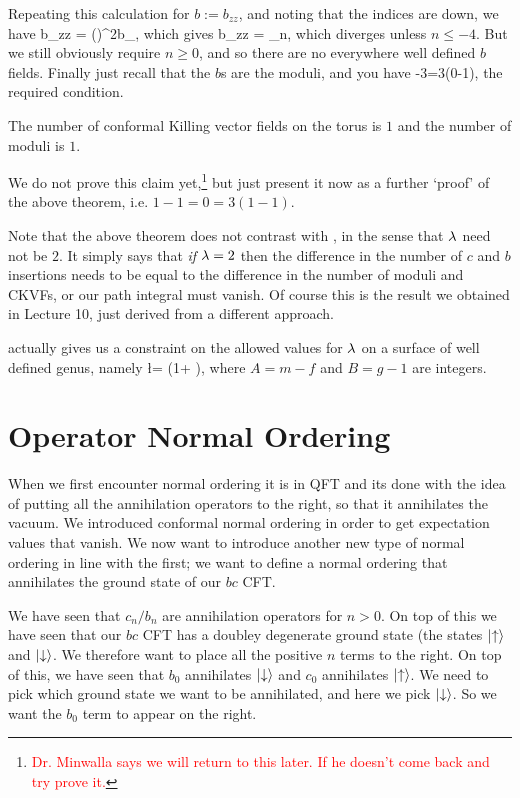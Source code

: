     Repeating this calculation for $b:=b_{zz}$, and noting that the indices are down, we have
    \bse 
        b_{zz} = \bigg(\bigg)^2b_{\omega\omega},
    \ese 
    which gives 
    \bse 
        b_{zz} =  \sum_n,
    \ese 
    which diverges unless $n\leq -4$. But we still obviously require $n\geq0$, and so there are no everywhere well defined $b$ fields. Finally just recall that the $b$s are the moduli, and you have 
    -3=3(0-1),
    \ese 
    the required condition. 
\eex 

\bcl 
    The number of conformal Killing vector fields on the torus is $1$ and the number of moduli is $1$.
\ecl 

We do not prove this claim yet,\footnote{\textcolor{red}{Dr. Minwalla says we will return to this later. If he doesn't come back and try prove it.}} but just present it now as a further `proof' of the above theorem, i.e. $1-1=0=3(1-1)$.

\br 
    Note that the above theorem does not contrast with , in the sense that $\lambda$ need not be $2$. It simply says that \textit{if} $\lambda=2$ then the difference in the number of $c$ and $b$ insertions needs to be equal to the difference in the number of moduli and CKVFs, or our path integral must vanish. Of course this is the result we obtained in Lecture 10, just derived from a different approach.  
\er 

\br 
     actually gives us a constraint on the allowed values for $\lambda$ on a surface of well defined genus, namely 
    \bse 
        \l = \bigg(1+ \bigg),
    \ese 
    where $A=m-f$ and $B=g-1$ are integers.
\er 

\section{Operator Normal Ordering}

When we first encounter normal ordering it is in QFT and its done with the idea of putting all the annihilation operators to the right, so that it annihilates the vacuum. We introduced conformal normal ordering in order to get expectation values that vanish. We now want to introduce another new type of normal ordering in line with the first; we want to define a normal ordering that annihilates the ground state of our $bc$ CFT.

We have seen that $c_n/b_n$ are annihilation operators for $n>0$. On top of this we have seen that our $bc$ CFT has a doubley degenerate ground state (the states $\ket{\uparrow}$ and $\ket{\downarrow}$. We therefore want to place all the positive $n$ terms to the right. On top of this, we have seen that $b_0$ annihilates $\ket{\downarrow}$ and $c_0$ annihilates $\ket{\uparrow}$. We need to pick which ground state we want to be annihilated, and here we pick $\ket{\downarrow}$. So we want the $b_0$ term to appear on the right. 

